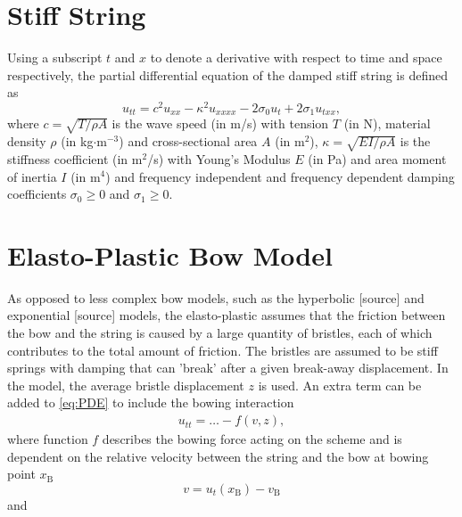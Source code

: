 \documentclass[twoside,a4paper]{article}
\begin{document}
\section{Stiff String}
Using a subscript $t$ and $x$ to denote a derivative with respect to time and space respectively, the partial differential equation of the damped stiff string is defined as
\begin{equation}\label{eq:PDE}
    u_{tt} = c^2u_{xx}-\kappa^2u_{xxxx}-2\sigma_0u_t+2\sigma_1u_{txx},
\end{equation}
where $c = \sqrt{T/\rho A}$ is the wave speed (in m/s) with tension $T$ (in N), material density $\rho$ (in kg$\cdot$m$^{-3}$) and cross-sectional area $A$ (in m$^2$), $\kappa = \sqrt{EI/\rho A}$ is the stiffness coefficient (in m$^2$/s) with Young's Modulus $E$ (in Pa) and area moment of inertia $I$ (in m$^4$) and frequency independent and frequency dependent damping coefficients $\sigma_0 \geq 0$ and $\sigma_1 \geq 0$.
\section{Elasto-Plastic Bow Model}
As opposed to less complex bow models, such as the hyperbolic [source] and exponential [source] models, the elasto-plastic assumes that the friction between the bow and the string is caused by a large quantity of bristles, each of which contributes to the total amount of friction. The bristles are assumed to be stiff springs with damping that can 'break' after a given break-away displacement.  In the model, the average bristle displacement $z$ is used. An extra term can be added to \eqref{eq:PDE} to include the bowing interaction
\begin{equation}
    \begin{aligned}
    \label{eq:FDS}
        u_{tt} = \hdots - f(v, z),
    \end{aligned}
\end{equation}
where function $f$ describes the bowing force acting on the scheme and is dependent on the relative velocity between the string and the bow at bowing point $x_\text{B}$
\begin{equation}
  v = u_t(x_\text{B}) - v_\text{B}
\end{equation}
and 
\end{document}
